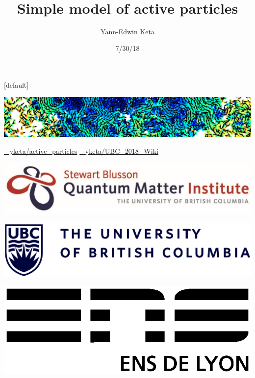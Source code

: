 \documentclass{beamer}
\title{Simple model of active particles}
\author{Yann-Edwin Keta}
\date{7/30/18}
\begin{document}
{
\makeatletter
    [default]
    \def\beamer@entrycode{\vspace*{-\headheight}}
\begin{frame}

\vspace*{-4mm}
{
 \hspace*{-\beamerleftmargin}%
\begin{minipage}{\paperwidth}
\includegraphics[width=\paperwidth]{header.png}
\end{minipage}
}

\titlepage

\begin{center}
\begin{minipage}{0.8\linewidth}
\href{https://github.com/yketa/active_particles}{{\footnotesize \faGithub~ yketa/active\_particles}}
\hfill\href{https://github.com/yketa/UBC_2018_Wiki}{{\footnotesize \faGithub~ yketa/UBC\_2018\_Wiki}}
\end{minipage}
\end{center}

\begin{minipage}{0.35\linewidth}
\includegraphics[scale=0.24]{logoqmi.jpg}\hfill
\end{minipage}
\hfill
\begin{minipage}{0.36\linewidth}
\includegraphics[scale=0.14]{logoubc.eps}
\end{minipage}
\hfill
\begin{minipage}{0.19\linewidth}
\hfill\includegraphics[scale=0.22]{logoens.eps}
\end{minipage}

\end{frame}
}
\end{document}

